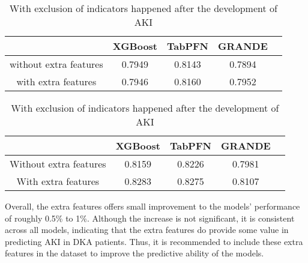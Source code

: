 \documentclass[../main.tex]{subfiles}
\begin{document}
\begin{table}[H]
    \centering
    \caption{AUC-ROC of tabular-based models with and without extra features}
    \label{tab:extra-features}

    \begin{subtable}{\textwidth}
        \centering
        \caption{Without exclusion of indicators happened after the development of AKI}
        \label{tab:extra-features-no-exclusion}
        \begin{tabular}{|c|c|c|c|c|}
            \hline
            \textbf{} & 
            \textbf{XGBoost} & 
            \textbf{TabPFN} & 
            \textbf{GRANDE} \\
            \hline

            without extra features & 
            0.7949 & 
            0.8143 & 
            0.7894 \\

            with extra features & 
            0.7946 & 
            0.8160 & 
            0.7952 \\

            \hline
        \end{tabular}
    \end{subtable}
    
    \vspace{1cm}

    \begin{subtable}{\textwidth}
        \centering
        \caption{With exclusion of indicators happened after the development of AKI}
        \label{tab:extra-features-exclusion}
        \begin{tabular}{|c|c|c|c|c|}
            \hline
            \textbf{} & 
            \textbf{XGBoost} & 
            \textbf{TabPFN} & 
            \textbf{GRANDE} \\
            \hline

            Without extra features & 
            0.8159 & 
            0.8226 & 
            0.7981 \\

            With extra features & 
            0.8283 & 
            0.8275 & 
            0.8107 \\

            \hline
        \end{tabular}
    \end{subtable}

\end{table}

Overall, the extra features offers small improvement to the models' performance of roughly 0.5\% to 1\%.
Although the increase is not significant, it is consistent across all models, indicating that the extra features do provide some value in predicting AKI in DKA patients.
Thus, it is recommended to include these extra features in the dataset to improve the predictive ability of the models.
\end{document}
